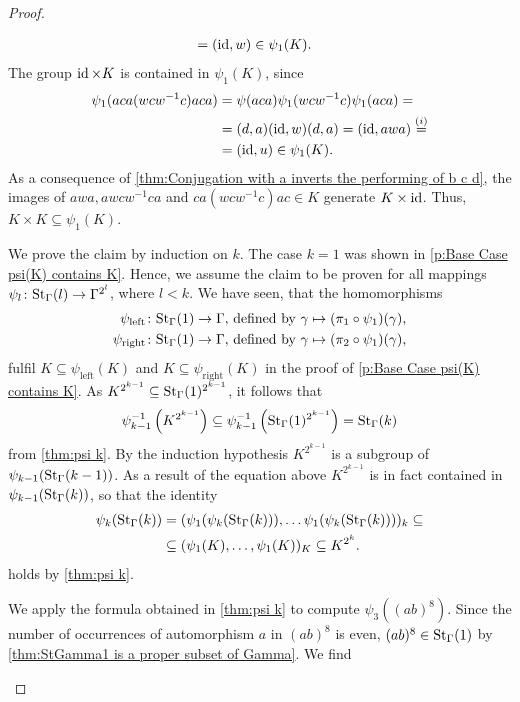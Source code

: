 \begin{proof}
\begin{plist}
\begin{align*}
					&=(\id,w)\in\psi_1(K).
\end{align*}
The group $\id\times K$ is contained in $\psi_1(K)$, since
\begin{align*}
\psi_1(aca(wcw^{-1}c)aca)	&=\psi(aca)\psi_1(wcw^{-1}c)\psi_1(aca)=\\
							&=(d,a)(\id,w)(d,a)=(\id,awa)\overset{(i)}{=}\\
							&=(\id,u)\in\psi_1(K).
\end{align*}
As a consequence of \cref{thm:Conjugation with a inverts the performing of b c d}, the images of $awa,awcw^{-1}ca$ and $ca(wcw^{-1}c)ac\in K$ generate $K\times\id$. Thus, $K\times K\subseteq\psi_1(K)$.
\item We prove the claim by induction on $k$. The case $k=1$ was shown in \ref{p:Base Case psi(K) contains K}. Hence, we assume the claim to be proven for all mappings $\psi_l\colon\St[\Gamma]{l}\to\Gamma^{2^l}$, where $l<k$. We have seen, that the homomorphisms
\begin{align*}
\psi_{\text{left}}\colon \St[\Gamma]{1}\to \Gamma,&\text{ defined by }\gamma\mapsto(\pi_1\circ\psi_1)(\gamma),\\
\psi_{\text{right}}\colon \St[\Gamma]{1}\to \Gamma,&\text{ defined by }\gamma\mapsto(\pi_2\circ\psi_1)(\gamma),
\end{align*}
fulfil $K\subseteq\psi_{\text{left}}(K)$ and $K\subseteq\psi_{\text{right}}(K)$ in the proof of \ref{p:Base Case psi(K) contains K}. As $K^{2^{k-1}}\subseteq\St[\Gamma]{1}^{2^{k-1}}$, it follows that
\begin{equation*}
\psi_{k-1}^{-1}\left(K^{2^{k-1}}\right)\subseteq \psi_{k-1}^{-1}\left(\St[\Gamma]{1}^{2^{k-1}}\right)=\St[\Gamma]{k}
\end{equation*}
from \cref{thm:psi k}. By the induction hypothesis $K^{2^{k-1}}$ is a subgroup of $\psi_{k-1}(\St[\Gamma]{k-1})$. As a result of the equation above $K^{2^{k-1}}$ is in fact contained in $\psi_{k-1}(\St[\Gamma]{k})$, so that the identity 
\begin{align*}
\psi_{k}(\St[\Gamma]{k})	&=(\psi_{1}(\psi_{k}(\St[\Gamma]{k})),\ldots\psi_{1}(\psi_{k}(\St[\Gamma]{k})))_k\subseteq\\
						&\subseteq(\psi_{1}(K),\ldots,\psi_{1}(K))_K\subseteq K^{2^k}.
\end{align*}
holds by \cref{thm:psi k}.
\item We apply the formula obtained in \cref{thm:psi k} to compute $\psi_3((ab)^8)$. Since the number of occurrences of automorphism $a$ in $(ab)^8$ is even, $(ab)^8\in\St[\Gamma]{1}$ by \cref{thm:StGamma1 is a proper subset of Gamma}. We find

\end{plist}
\end{proof}

